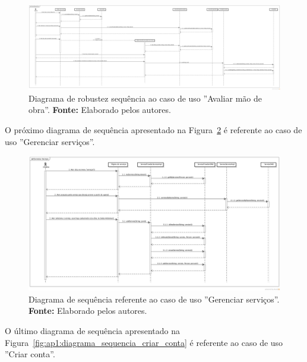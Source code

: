 \captionsetup[figure]{list=no}
\begin{figure}[h!]
	\centerline{\includegraphics[angle=90,scale=0.17]{./imagens/apendices/diagrama-sequencia-avaliar-mao-de-obra.png}}
	\caption[Diagrama de sequência referente ao caso de uso ''Avaliar mão de obra''.]
	{Diagrama de robustez sequência ao caso de uso ''Avaliar mão de obra''. \textbf{Fonte:} Elaborado pelos autores.}
	\label{fig:ap1:diagrama_sequencia_avaliar_mao_de_obra}
\end{figure}

O próximo diagrama de sequência apresentado na Figura~\ref{fig:ap1:diagrama_sequencia_gerenciar_servicos} é referente ao caso de uso ''Gerenciar serviços''.

\newpage
\captionsetup[figure]{list=no}
\begin{figure}[h!]
	\centerline{\includegraphics[angle=90,scale=0.35]{./imagens/apendices/diagrama-sequencia-gerenciar-servicos.png}}
	\caption[Diagrama de sequência referente ao caso de uso ''Gerenciar serviços''.]
	{Diagrama de sequência referente ao caso de uso ''Gerenciar serviços''. \textbf{Fonte:} Elaborado pelos autores.}
	\label{fig:ap1:diagrama_sequencia_gerenciar_servicos}
\end{figure}

O último diagrama de sequência apresentado na Figura~\ref{fig:ap1:diagrama_sequencia_criar_conta} é referente ao caso de uso ''Criar conta''.

